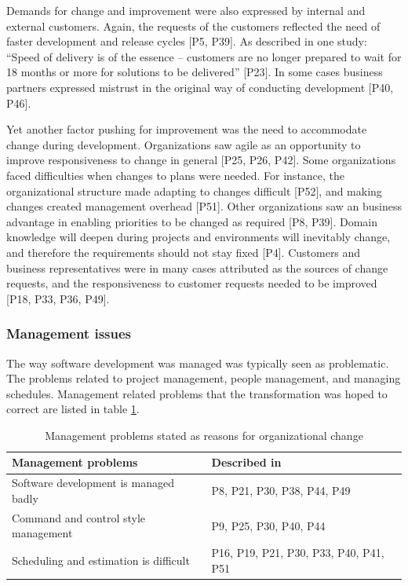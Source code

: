 \documentclass[preprint,authoryear,12pt]{elsarticle}
\begin{document}
Demands for change and improvement were also expressed by internal and external
customers. Again, the requests of the customers reflected the need of faster
development and release cycles [P5, P39]. As described in one study: ``Speed of
delivery is of the essence -- customers are no longer prepared to wait for 18
months or more for solutions to be delivered'' [P23]. In some cases business
partners expressed mistrust in the original way of conducting development [P40,
P46].

Yet another factor pushing for improvement was the need to accommodate change
during development. Organizations saw agile as an opportunity to improve
responsiveness to change in general [P25, P26, P42].
Some organizations faced difficulties when changes to plans were needed. For
instance, the organizational structure made adapting to changes difficult [P52],
and making changes created management overhead [P51]. Other organizations saw an
business advantage in enabling priorities to be changed as required [P8, P39].
Domain knowledge will deepen during projects and environments will inevitably
change, and therefore the requirements should not stay fixed [P4].
Customers and business representatives were in many cases attributed as the
sources of change requests, and the responsiveness to customer requests needed
to be improved [P18, P33, P36, P49].

\subsubsection{Management issues}

The way software development was managed was typically seen as problematic. The
problems related to project management, people management, and managing
schedules. Management related problems that the transformation was hoped to
correct are listed in table \ref{table:reasonstochange_management}.

\begin{table}[b]
    \centering
    \begin{tabular}{ >{\raggedright\arraybackslash}p{}
                     >{\raggedright\arraybackslash}p{} }
        \toprule
        Management problems           &  Described in  \\
        \midrule
        Software development is managed badly   &  P8, P21, P30, P38, P44, P49  \\
        Command and control style management    &  P9, P25, P30, P40, P44  \\
        Scheduling and estimation is difficult  &  P16, P19, P21, P30, P33, P40, P41, P51  \\
        \bottomrule
    \end{tabular}
    \caption{Management problems stated as reasons for organizational change}
    \label{table:reasonstochange_management}
\end{table}
\end{document}
